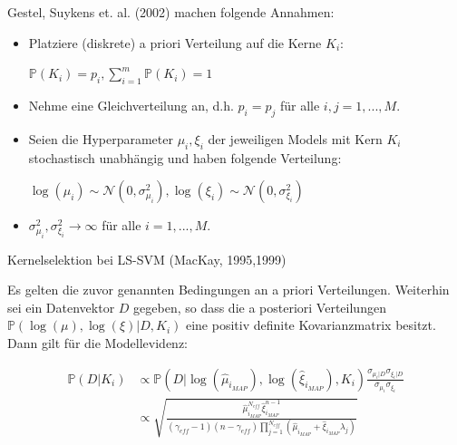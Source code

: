 \documentclass{beamer}
\begin{document}
{\begin{frame}
Gestel, Suykens et. al. (2002) machen folgende Annahmen:
\begin{itemize}
	\item Platziere (diskrete) a priori Verteilung auf die Kerne $K_i$:
		\begin{center}
			$\mathbb{P}(K_i) = p_i, \sum_{i=1}^{m} \mathbb{P}(K_i) = 1$
		\end{center}
	\item Nehme eine Gleichverteilung an, d.h. $p_i = p_j$ für alle $i,j = 1,...,M$.
	\item Seien die Hyperparameter $\mu_i, \xi_i$ der jeweiligen Models mit Kern $K_i$ 				  stochastisch unabhängig und haben folgende Verteilung:
		  \begin{center}
				$\log(\mu_i) \sim \mathcal{N}(0, \sigma_{\mu_i}^2), \log(\xi_i) \sim 						\mathcal{N}(0, \sigma_{\xi_i}^2)$ 
		  \end{center}
	\item $\sigma_{\mu_i}^2, \sigma_{\xi_i}^2 \rightarrow \infty$ für alle $i = 1,...,M				   $.
\end{itemize}
\end{frame}






\begin{frame}

\begin{block}{Kernelselektion bei LS-SVM (MacKay, 1995,1999)}

Es gelten die zuvor genannten Bedingungen an a priori Verteilungen. Weiterhin sei ein Datenvektor $D$ gegeben, so dass die a posteriori Verteilungen $\mathbb{P}(\log(\mu),\log(\xi) \vert D, K_i)$ eine positiv definite Kovarianzmatrix besitzt. Dann gilt für die Modellevidenz:


\begin{align}
\mathbb{P}(D \vert K_i) & \propto \mathbb{P}(D \vert \log(\hat{\mu}_{i_{MAP}}), \log(\hat{\xi}_{i_{MAP}}), K_i)\frac{\sigma_{\mu_i\vert D} \sigma_{\xi_i\vert D}}{\sigma_{\mu_i} \sigma_{\xi_i}}\\
&\propto \sqrt{\frac{\hat{\mu}^{N_{eff}}_{i_{MAP}} \hat{\xi}^{n-1}_{i_{MAP}}}{(\gamma_{eff}-1)(n - \gamma_{eff}) \prod_{j=1}^{N_{eff}}(\hat{\mu}_{i_{MAP}} + \hat{\xi}_{i_{MAP}}\lambda_j)}}
\end{align}


\end{block}
\end{frame}}
\end{document}
